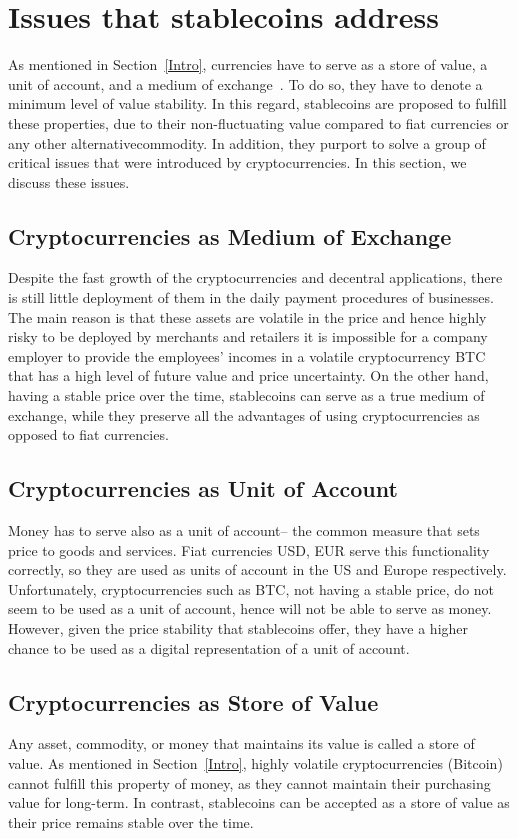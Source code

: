 \section{Issues that stablecoins address}
As mentioned in Section~\ref{Intro}, currencies have to serve as a store of value, a unit of account, and a medium of exchange~\cite{smithin2002money}. To do so, they have to denote a minimum level of value stability. In this regard, stablecoins are proposed to fulfill these properties, due to their non-fluctuating value compared to fiat currencies or any other alternative\eg commodity. In addition, they purport to solve a group of critical issues that were introduced by cryptocurrencies. In this section, we discuss these issues.

\subsection{Cryptocurrencies as Medium of Exchange}
Despite the fast growth of the cryptocurrencies and decentral applications, there is still little deployment of them in the daily payment procedures of businesses. The main reason is that these assets are volatile in the price and hence highly risky to be deployed by merchants and retailers \ie it is impossible for a company employer to provide the employees' incomes in a volatile cryptocurrency \eg BTC that has a high level of future value and price uncertainty. On the other hand, having a stable price over the time, stablecoins can serve as a true medium of exchange, while they preserve all the advantages of using cryptocurrencies as opposed to fiat currencies.

\subsection{Cryptocurrencies as Unit of Account}
Money has to serve also as a unit of account-- the common measure that sets price to goods and services. Fiat currencies \eg USD, EUR \etc serve this functionality correctly, so they are used as units of account in the US and Europe respectively. Unfortunately, cryptocurrencies such as BTC, not having a stable price, do not seem to be used as a unit of account, hence will not be able to serve as money. However, given the price stability that stablecoins offer, they have a higher chance to be used as a digital representation of a unit of account.

\subsection{Cryptocurrencies as Store of Value}
Any asset, commodity, or money that maintains its value is called a store of value. As mentioned in Section~\ref{Intro}, highly volatile cryptocurrencies (\ie Bitcoin) cannot fulfill this property of money, as they cannot maintain their purchasing value for long-term. In contrast, stablecoins can be accepted as a store of value as their price remains stable over the time.

